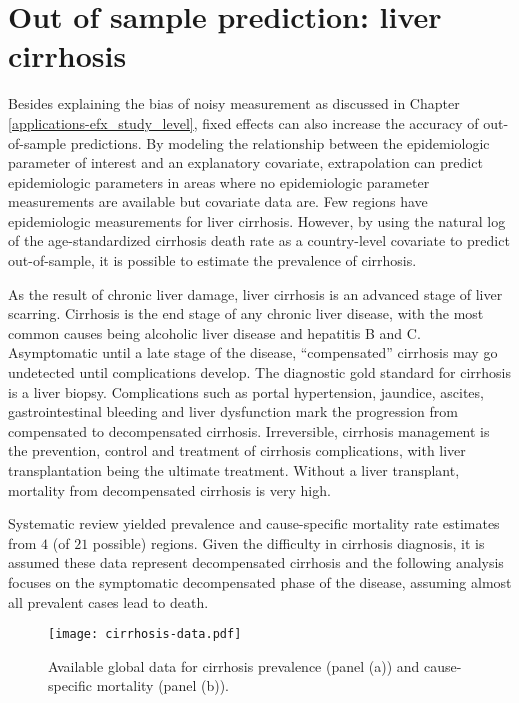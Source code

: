\chapter{Out of sample prediction: liver cirrhosis}
\label{applications-efx_country_level}

Besides explaining the bias of noisy measurement as discussed in
Chapter \ref{applications-efx_study_level}, fixed effects can also
increase the accuracy of out-of-sample predictions.  By modeling the
relationship between the epidemiologic parameter of interest and an
explanatory covariate, extrapolation can predict epidemiologic
parameters in areas where no epidemiologic parameter measurements are
available but covariate data are.  Few regions have epidemiologic
measurements for liver cirrhosis.  However, by using the natural log
of the age-standardized cirrhosis death rate as a country-level
covariate to predict out-of-sample, it is possible to estimate the
prevalence of cirrhosis.

As the result of chronic liver damage, liver cirrhosis is an advanced
stage of liver scarring.  Cirrhosis is the end stage of any chronic
liver disease, with the most common causes being alcoholic liver
disease and hepatitis B and C.  Asymptomatic until a late stage of the
disease, ``compensated'' cirrhosis may go undetected until
complications develop.  The diagnostic gold standard for cirrhosis is
a liver biopsy.  Complications such as portal hypertension, jaundice,
ascites, gastrointestinal bleeding and liver dysfunction mark the
progression from compensated to decompensated cirrhosis.
Irreversible, cirrhosis management is the prevention, control and
treatment of cirrhosis complications, with liver transplantation being
the ultimate treatment.  Without a liver transplant, mortality from
decompensated cirrhosis is very
high. \cite{garcia-tsao_management_2009, damico_natural_2006,
  schuppan_liver_2008}

Systematic review yielded prevalence and cause-specific mortality rate
estimates from $4$ (of $21$ possible) regions.  Given the difficulty in
cirrhosis diagnosis, it is assumed these data represent decompensated
cirrhosis and the following analysis focuses on the symptomatic
decompensated phase of the disease, assuming almost all prevalent
cases lead to death.

    \begin{figure}[h]
        \begin{center}
            \texttt{[image: cirrhosis-data.pdf]}
            \caption{Available global data for cirrhosis prevalence
              (panel (a)) and cause-specific mortality (panel (b)).}
            \label{fig:app-cirrhosis data}
        \end{center}
    \end{figure}

